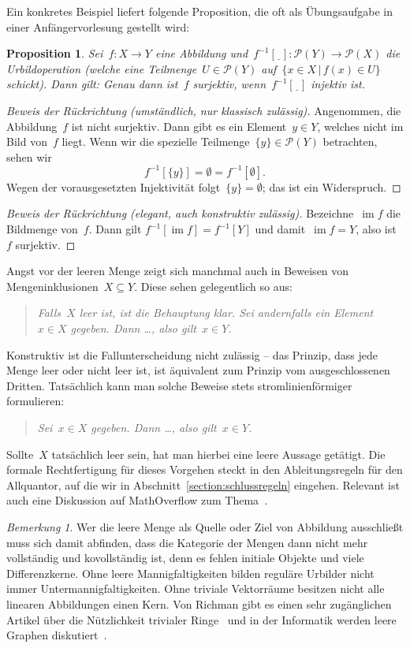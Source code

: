 \documentclass[a4paper,ngerman,12pt]{scrartcl}
\theoremstyle{definition}
\theoremstyle{plain}
\newtheorem{prop}[defn]{Proposition}
\theoremstyle{remark}
\newtheorem{bem}[defn]{Bemerkung}
\renewcommand{\P}{\mathcal{P}}
\newcommand{\freist}{\underline{\ \ }}
\DeclareMathOperator{\im}{im}
\renewcommand{\_}{\mathpunct{.}\,}
\newcommand{\?}{\,{:}\,}
\begin{document}
Ein konkretes Beispiel liefert folgende Proposition, die oft als Übungsaufgabe in
einer Anfängervorlesung gestellt wird:
\begin{prop}Sei~$f : X \to Y$ eine Abbildung und~$f^{-1}[\freist] : \P(Y) \to
\P(X)$ die Urbildoperation (welche eine Teilmenge~$U \in \P(Y)$ auf~$\{ x \in X
\,|\, f(x) \in U \}$ schickt). Dann gilt: Genau dann ist~$f$ surjektiv,
wenn~$f^{-1}[\freist]$ injektiv ist.
\end{prop}
\begin{proof}[Beweis der Rückrichtung (umständlich, nur klassisch zulässig)]
Angenommen, die Abbildung~$f$ ist nicht surjektiv. Dann gibt es ein Element~$y \in
Y$, welches nicht im Bild von~$f$ liegt. Wenn wir die spezielle
Teilmenge~$\{y\} \in \P(Y)$ betrachten, sehen wir
\[ f^{-1}[\{y\}] = \emptyset = f^{-1}[\emptyset]. \]
Wegen der vorausgesetzten Injektivität folgt~$\{y\} = \emptyset$; das ist ein
Widerspruch.\end{proof}
\begin{proof}[Beweis der Rückrichtung (elegant, auch konstruktiv zulässig)]
Bezeichne~$\im f$ die Bildmenge von~$f$. Dann gilt
$f^{-1}[\im f] = f^{-1}[Y]$
und damit~$\im f = Y$, also ist~$f$ surjektiv.\end{proof}

Angst vor der leeren Menge zeigt sich manchmal auch in Beweisen von
Mengeninklusionen~$X \subseteq Y$. Diese sehen gelegentlich so aus:
\begin{quote}\emph{Falls~$X$ leer ist, ist die Behauptung klar. Sei andernfalls
ein Element~$x \in X$ gegeben. Dann \ldots, also gilt~$x \in Y$.}\end{quote}
Konstruktiv ist die Fallunterscheidung nicht zulässig -- das Prinzip, dass jede
Menge leer oder nicht leer ist, ist äquivalent zum Prinzip vom ausgeschlossenen
Dritten. Tatsächlich kann man solche Beweise stets stromlinienförmiger
formulieren:
\begin{quote}\emph{Sei~$x \in X$ gegeben. Dann \ldots, also gilt~$x \in
Y$.}\end{quote}
Sollte~$X$ tatsächlich leer sein, hat man hierbei eine leere Aussage getätigt.
Die formale Rechtfertigung für dieses Vorgehen steckt in den Ableitungsregeln
für den Allquantor, auf die wir in Abschnitt~\ref{section:schlussregeln}
eingehen. Relevant ist auch eine Diskussion auf MathOverflow zum
Thema~\cite{mathoverflow:emptyset}.

\begin{bem}Wer die leere Menge als Quelle oder Ziel von Abbildung ausschließt
muss sich damit abfinden, dass die Kategorie der Mengen dann nicht mehr
vollständig und kovollständig ist, denn es fehlen initiale Objekte und viele
Differenzkerne. Ohne leere Mannigfaltigkeiten bilden reguläre Urbilder nicht
immer Untermannigfaltigkeiten. Ohne triviale Vektorräume besitzen nicht alle
linearen Abbildungen einen Kern. Von Richman gibt es einen sehr zugänglichen Artikel
über die Nützlichkeit trivialer Ringe~\cite{richman:trivial-rings} und in der
Informatik werden leere Graphen diskutiert~\cite{harary:read:empty-graph}.\end{bem}
\end{document}
